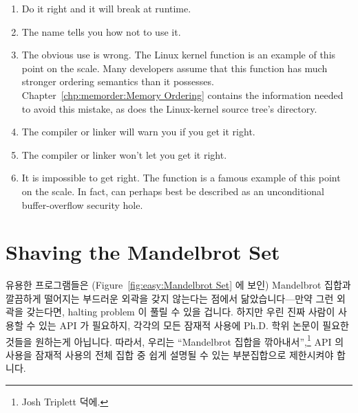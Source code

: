 \begin{enumerate}
\item	Do it right and it will break at runtime.
\item	The name tells you how not to use it.
\item	The obvious use is wrong.
	The Linux kernel  function is an example of
	this point on the scale.
	Many developers assume that this function has much
	stronger ordering semantics than it possesses.
	Chapter~\ref{chp:memorder:Memory Ordering} contains the
	information needed to avoid this mistake, as does the
	Linux-kernel source tree's  directory.
\item	The compiler or linker will warn you if you get it right.
\item	The compiler or linker won't let you get it right.
\item	It is impossible to get right.
	The  function is a famous example of this point on
	the scale.
	In fact,  can perhaps best be described as
	an unconditional buffer-overflow security hole.
\fi
\end{enumerate}

\section{Shaving the Mandelbrot Set}
\label{sec:easy:Shaving the Mandelbrot Set}

유용한 프로그램들은
(Figure~\ref{fig:easy:Mandelbrot Set} 에 보인) Mandelbrot 집합과 깔끔하게
떨어지는 부드러운 외곽을 갖지 않는다는 점에서 닮았습니다---만약 그런 외곽을
갖는다면, halting problem 이 풀릴 수 있을 겁니다.
하지만 우린 진짜 사람이 사용할 수 있는 API 가 필요하지, 각각의 모든 잠재적
사용에 Ph.D. 학위 논문이 필요한 것들을 원하는게 아닙니다.
따라서, 우리는 ``Mandelbrot 집합을 깎아내서'',\footnote{
	Josh Triplett 덕에.}
API 의 사용을 잠재적 사용의 전체 집합 중 쉽게 설명될 수 있는 부분집합으로
제한시켜야 합니다.

